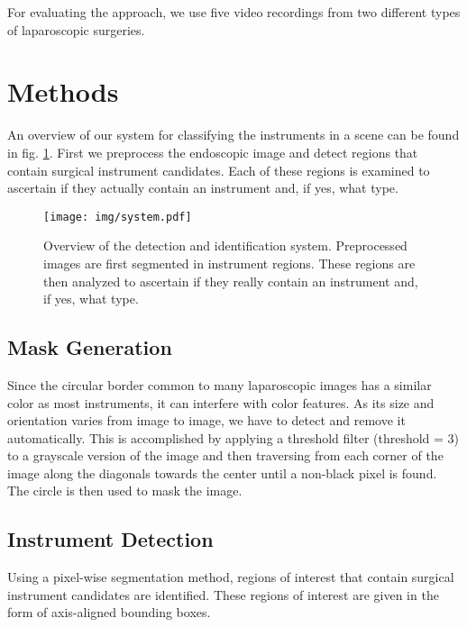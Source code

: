 \documentclass{llncs}
\begin{document}
For evaluating the approach, we use five video recordings from two different types of laparoscopic surgeries.
\section{Methods}
An overview of our system for classifying the instruments in a scene can be found in fig. \ref{systemdig}.
First we preprocess the endoscopic image and detect regions that contain surgical instrument candidates.
Each of these regions is examined to ascertain if they actually contain an instrument and, if yes, what type. 
\begin{figure}[thb]
\centering
 \texttt{[image: img/system.pdf]}
 \caption{Overview of the detection and identification system. Preprocessed images are first segmented in instrument regions. These regions are then analyzed to ascertain if they really contain an instrument and, if yes, what type.}
 
\label{systemdig}
\end{figure}
\subsection{Mask Generation}
Since the circular border common to many laparoscopic images has a similar color as most instruments, it can interfere with color features. 
As its size and orientation varies from image to image, we have to detect and remove it automatically.
This is accomplished by applying a threshold filter (threshold = 3) to a grayscale version of the image and then traversing from each corner of the image along the diagonals towards the center until a non-black pixel is found.
The circle is then used to mask the image.
\subsection{Instrument Detection}
Using a pixel-wise segmentation method, regions of interest that contain surgical instrument candidates are identified.
These regions of interest are given in the form of axis-aligned bounding boxes.
\end{document}
